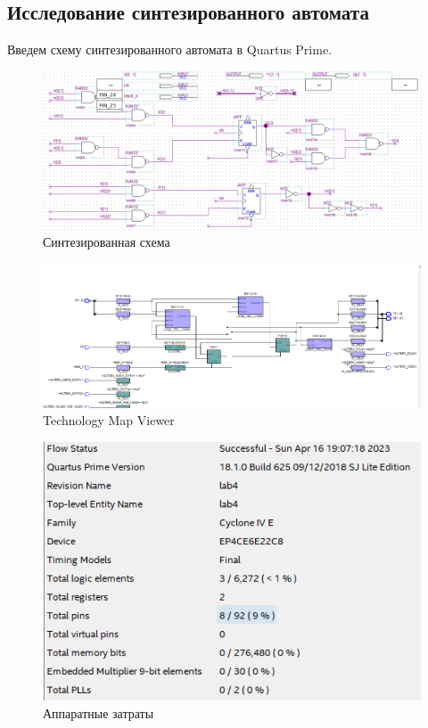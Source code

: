 \documentclass[a4paper,12pt]{article}
\begin{document}
    \subsection{Исследование синтезированного автомата}
    Введем схему синтезированного автомата в Quartus Prime.
    \begin{figure}[H]
        \centering
        \includegraphics[width=\linewidth]{polytech/scheme/report-lab4/subfiles/images/scheme}
        \caption{Синтезированная схема}
        \label{fig:scheme}
    \end{figure}
    \begin{figure}[H]
        \centering
        \includegraphics[width=\linewidth]{polytech/scheme/report-lab4/subfiles/images/tmv1}
        \caption{Technology Map Viewer}
        \label{fig:tmv1}
    \end{figure}
    \begin{figure}[H]
        \centering
        \includegraphics[width=.7\linewidth]{polytech/scheme/report-lab4/subfiles/images/app}
        \caption{Аппаратные затраты}
        \label{fig:app}
    \end{figure}
\end{document}
